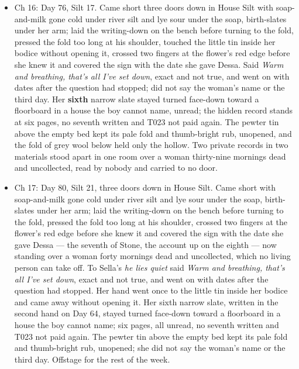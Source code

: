 \documentclass{design/chronicle}
\begin{document}
{\begin{itemize}[leftmargin=1.4em,itemsep=1pt,topsep=3pt,parsep=0pt]
\item Ch 16: Day 76, Silt 17. Came short three doors down in House Silt with soap-and-milk gone cold under river silt and lye sour under the soap, birth-slates under her arm; laid the writing-down on the bench before turning to the fold, pressed the fold too long at his shoulder, touched the little tin inside her bodice without opening it, crossed two fingers at the flower’s red edge before she knew it and covered the sign with the date she gave Dessa. Said \emph{Warm and breathing, that’s all I’ve set down}, exact and not true, and went on with dates after the question had stopped; did not say the woman’s name or the third day. Her \textbf{sixth} narrow slate stayed turned face-down toward a floorboard in a house the boy cannot name, unread; the hidden record stands at six pages, no seventh written and T023 not paid again. The pewter tin above the empty bed kept its pale fold and thumb-bright rub, unopened, and the fold of grey wool below held only the hollow. Two private records in two materials stood apart in one room over a woman thirty-nine mornings dead and uncollected, read by nobody and carried to no door.

\end{itemize}

\begin{itemize}[leftmargin=1.4em,itemsep=1pt,topsep=3pt,parsep=0pt]

\item Ch 17: Day 80, Silt 21, three doors down in House Silt. Came short with soap-and-milk gone cold under river silt and lye sour under the soap, birth-slates under her arm; laid the writing-down on the bench before turning to the fold, pressed the fold too long at his shoulder, crossed two fingers at the flower’s red edge before she knew it and covered the sign with the date she gave Dessa — the seventh of Stone, the account up on the eighth — now standing over a woman forty mornings dead and uncollected, which no living person can take off. To Sella’s \emph{he lies quiet} said \emph{Warm and breathing, that’s all I’ve set down}, exact and not true, and went on with dates after the question had stopped. Her hand went once to the little tin inside her bodice and came away without opening it. Her sixth narrow slate, written in the second hand on Day 64, stayed turned face-down toward a floorboard in a house the boy cannot name; six pages, all unread, no seventh written and T023 not paid again. The pewter tin above the empty bed kept its pale fold and thumb-bright rub, unopened; she did not say the woman’s name or the third day. Offstage for the rest of the week.


\end{itemize}}
\end{document}
